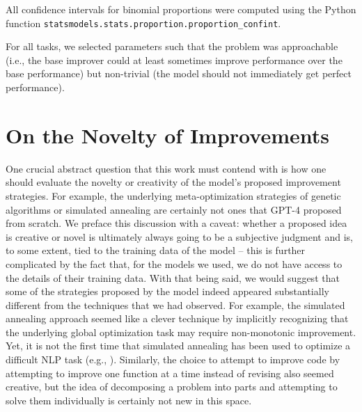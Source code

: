 \documentclass{article} %
\begin{document}
All \citet{wilson1927probable} confidence intervals for binomial proportions were computed using the Python function \lstinline[language=Python]{statsmodels.stats.proportion.proportion_confint}.

For all tasks, we selected parameters such that the problem was approachable (i.e., the base improver could at least sometimes improve performance over the base performance) but non-trivial (the model should not immediately get perfect performance).

\section{On the Novelty of Improvements}
One crucial abstract question that this work must contend with is how one should evaluate the novelty or creativity of the model's proposed improvement strategies. For example, the underlying meta-optimization strategies of genetic algorithms or simulated annealing are certainly not ones that GPT-4 proposed from scratch. We preface this discussion with a caveat: whether a proposed idea is creative or novel is ultimately always going to be a subjective judgment and is, to some extent, tied to the training data of the model -- this is further complicated by the fact that, for the models we used, we do not have access to the details of their training data. With that being said, we would suggest that some of the strategies proposed by the model indeed appeared substantially different from the techniques that we had observed. For example, the simulated annealing approach seemed like a clever technique by implicitly recognizing that the underlying global optimization task may require non-monotonic improvement. Yet, it is not the first time that simulated annealing has been used to optimize a difficult NLP task (e.g., \citet{liu-etal-2020-unsupervised}). Similarly, the choice to attempt to improve code by attempting to improve one function at a time instead of revising also seemed creative, but the idea of decomposing a problem into parts and attempting to solve them individually is certainly not new in this space.
\end{document}

